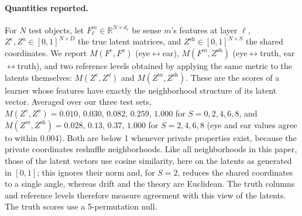 \documentclass[11pt]{article}
\newcommand{\lr}{\ensuremath{\leftrightarrow}}
\begin{document}
\paragraph{Quantities reported.} For $N$ test objects, let $F^m_\ell\in\mathbb R^{N\times d_\ell}$ be sense $m$'s features at layer $\ell$, $Z^{e},Z^{a}\in[0,1]^{N\times D}$ the true latent matrices, and $Z^{\mathrm{sh}}\in[0,1]^{N\times S}$ the shared coordinates. We report $M(F^e,F^a)$ (eye\lr{}ear), $M(F^m,Z^{\mathrm{sh}})$ (eye\lr{}truth, ear\lr{}truth), and two reference levels obtained by applying the same metric to the latents themselves: $M(Z^e,Z^a)$ and $M(Z^m,Z^{\mathrm{sh}})$. These are the scores of a learner whose features have exactly the neighborhood structure of its latent vector. Averaged over our three test sets, $M(Z^e,Z^a)=0.010,\,0.030,\,0.082,\,0.259,\,1.000$ for $S=0,2,4,6,8$, and $M(Z^m,Z^{\mathrm{sh}})=0.028,\,0.13,\,0.37,\,1.000$ for $S=2,4,6,8$ (eye and ear values agree to within 0.004). Both are below 1 whenever private properties exist, because the private coordinates reshuffle neighborhoods. Like all neighborhoods in this paper, those of the latent vectors use cosine similarity, here on the latents as generated in $[0,1]$; this ignores their norm and, for $S=2$, reduces the shared coordinates to a single angle, whereas drift and the theory are Euclidean. The truth columns and reference levels therefore measure agreement with this view of the latents. The truth scores use a 5-permutation null.
\end{document}
